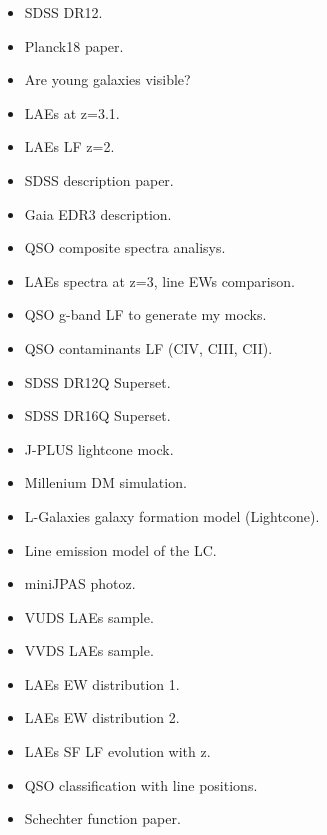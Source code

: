 \documentclass[a4paper,fleqn,usenatbib]{mnras}
\begin{document}
\begin{itemize}
    \item SDSS DR12. \cite{Alam2015}
    \item Planck18 paper. \cite{Planck18}
    \item Are young galaxies visible? \cite{Partridge1967}
    \item LAEs at z=3.1. \cite{Gronwall2007}
    \item LAEs LF z=2. \cite{Sobral2017}
    \item SDSS description paper. \cite{York2000}
    \item Gaia EDR3 description. \cite{Brown2021}
    \item QSO composite spectra analisys. \cite{VandenBerk2001}
    \item LAEs spectra at z=3, line EWs comparison. \cite{Nakajima2018}
    \item QSO g-band LF to generate my mocks. \cite{Palanque-Delabrouille2016}
    \item QSO contaminants LF (CIV, CIII, CII). \cite{Stroe2017a, Stroe2017b}
    \item SDSS DR12Q Superset. \cite{Paris2017}
    \item SDSS DR16Q Superset. \cite{Lyke2020}
    \item J-PLUS lightcone mock. \cite{Izquierdo-Villalba2019}
    \item Millenium DM simulation. \cite{Springel2005}
    \item L-Galaxies galaxy formation model (Lightcone). \cite{Guo2011}
    \item Line emission model of the LC. \cite{Orsi2014}
    \item miniJPAS photoz. \cite{Hernan-Caballero2021}
    \item VUDS LAEs sample. \cite{Cassata2015}
    \item VVDS LAEs sample. \cite{Cassata2011}
    \item LAEs EW distribution 1. \cite{Kerutt2022}
    \item LAEs EW distribution 2. \cite{Zheng2013}
    \item LAEs SF LF evolution with z. \cite{Drake2017}
    \item QSO classification with line positions. \cite{Matthee2017b}
    \item Schechter function paper. \cite{Schechter1976}
\end{itemize}


\end{document}
